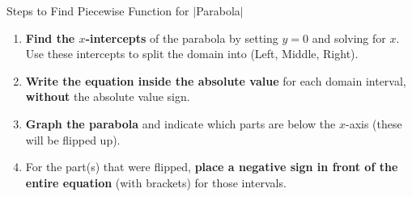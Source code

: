 \documentclass[aspectratio=169]{beamer}
\begin{document}
\begin{frame}{Steps to Find Piecewise Function for $|$Parabola$|$}
    \begin{tcolorbox}[colback=lightgray,colframe=primary,title=How to Write the Piecewise Function]
        \footnotesize
        \begin{enumerate}
            \item \textbf{Find the $x$-intercepts} of the parabola by setting $y=0$ and solving for $x$. Use these intercepts to split the domain into (Left, Middle, Right).
            \item \textbf{Write the equation inside the absolute value} for each domain interval, \textbf{without} the absolute value sign.
            \item \textbf{Graph the parabola} and indicate which parts are below the $x$-axis (these will be flipped up).
            \item For the part(s) that were flipped, \textbf{place a negative sign in front of the entire equation} (with brackets) for those intervals.
        \end{enumerate}
    \end{tcolorbox}
\end{frame}
\end{document}
